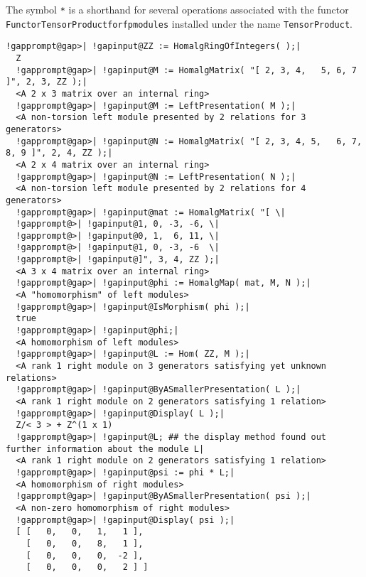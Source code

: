 \documentclass[a4paper,11pt]{report}
\begin{document}
{{{ The symbol \texttt{*} is a shorthand for several operations associated with the functor \texttt{Functor{\textunderscore}TensorProduct{\textunderscore}for{\textunderscore}fp{\textunderscore}modules} installed under the name \texttt{TensorProduct}. 
\begin{Verbatim}[commandchars=!@|,fontsize=\small,frame=single,label=Example]
  !gapprompt@gap>| !gapinput@ZZ := HomalgRingOfIntegers( );|
  Z
  !gapprompt@gap>| !gapinput@M := HomalgMatrix( "[ 2, 3, 4,   5, 6, 7 ]", 2, 3, ZZ );|
  <A 2 x 3 matrix over an internal ring>
  !gapprompt@gap>| !gapinput@M := LeftPresentation( M );|
  <A non-torsion left module presented by 2 relations for 3 generators>
  !gapprompt@gap>| !gapinput@N := HomalgMatrix( "[ 2, 3, 4, 5,   6, 7, 8, 9 ]", 2, 4, ZZ );|
  <A 2 x 4 matrix over an internal ring>
  !gapprompt@gap>| !gapinput@N := LeftPresentation( N );|
  <A non-torsion left module presented by 2 relations for 4 generators>
  !gapprompt@gap>| !gapinput@mat := HomalgMatrix( "[ \|
  !gapprompt@>| !gapinput@1, 0, -3, -6, \|
  !gapprompt@>| !gapinput@0, 1,  6, 11, \|
  !gapprompt@>| !gapinput@1, 0, -3, -6  \|
  !gapprompt@>| !gapinput@]", 3, 4, ZZ );|
  <A 3 x 4 matrix over an internal ring>
  !gapprompt@gap>| !gapinput@phi := HomalgMap( mat, M, N );|
  <A "homomorphism" of left modules>
  !gapprompt@gap>| !gapinput@IsMorphism( phi );|
  true
  !gapprompt@gap>| !gapinput@phi;|
  <A homomorphism of left modules>
  !gapprompt@gap>| !gapinput@L := Hom( ZZ, M );|
  <A rank 1 right module on 3 generators satisfying yet unknown relations>
  !gapprompt@gap>| !gapinput@ByASmallerPresentation( L );|
  <A rank 1 right module on 2 generators satisfying 1 relation>
  !gapprompt@gap>| !gapinput@Display( L );|
  Z/< 3 > + Z^(1 x 1)
  !gapprompt@gap>| !gapinput@L;	## the display method found out further information about the module L|
  <A rank 1 right module on 2 generators satisfying 1 relation>
  !gapprompt@gap>| !gapinput@psi := phi * L;|
  <A homomorphism of right modules>
  !gapprompt@gap>| !gapinput@ByASmallerPresentation( psi );|
  <A non-zero homomorphism of right modules>
  !gapprompt@gap>| !gapinput@Display( psi );|
  [ [   0,   0,   1,   1 ],
    [   0,   0,   8,   1 ],
    [   0,   0,   0,  -2 ],
    [   0,   0,   0,   2 ] ]
  

\end{Verbatim}}}}
\end{document}
